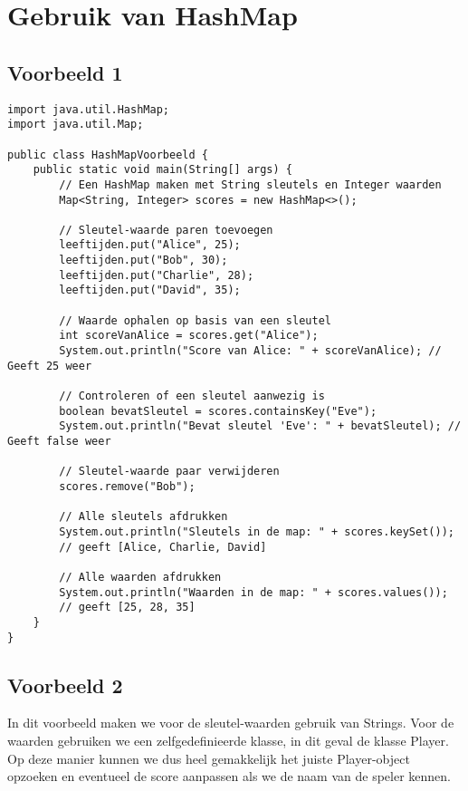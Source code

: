\section{Gebruik van HashMap}

\subsection{Voorbeeld 1}

\begin{lstlisting}
import java.util.HashMap;
import java.util.Map;

public class HashMapVoorbeeld {
    public static void main(String[] args) {
        // Een HashMap maken met String sleutels en Integer waarden
        Map<String, Integer> scores = new HashMap<>();

        // Sleutel-waarde paren toevoegen
        leeftijden.put("Alice", 25);
        leeftijden.put("Bob", 30);
        leeftijden.put("Charlie", 28);
        leeftijden.put("David", 35);

        // Waarde ophalen op basis van een sleutel
        int scoreVanAlice = scores.get("Alice");
        System.out.println("Score van Alice: " + scoreVanAlice); // Geeft 25 weer

        // Controleren of een sleutel aanwezig is
        boolean bevatSleutel = scores.containsKey("Eve");
        System.out.println("Bevat sleutel 'Eve': " + bevatSleutel); // Geeft false weer

        // Sleutel-waarde paar verwijderen
        scores.remove("Bob");

        // Alle sleutels afdrukken
        System.out.println("Sleutels in de map: " + scores.keySet()); 
        // geeft [Alice, Charlie, David]

        // Alle waarden afdrukken
        System.out.println("Waarden in de map: " + scores.values()); 
        // geeft [25, 28, 35]
    }
}
\end{lstlisting}

\subsection{Voorbeeld 2}

In dit voorbeeld maken we voor de sleutel-waarden gebruik van Strings. Voor de waarden gebruiken we een zelfgedefinieerde klasse, in dit geval de klasse Player. 
Op deze manier kunnen we dus heel gemakkelijk het juiste Player-object opzoeken en eventueel de score aanpassen als we de naam van de speler kennen.

